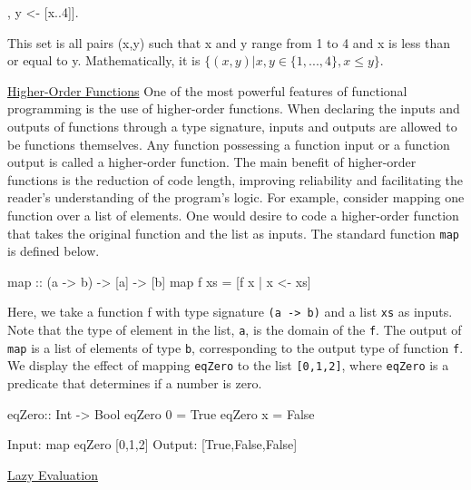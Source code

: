 \documentclass[11pt]{article}
\begin{document}
\hspace{2cm}\begin{verbbox}
[(x,y) | x <- [1..4], y <- [x..4]]. 
\end{verbbox}
\theverbbox

This set is all pairs (x,y) such that x and y range from 1 to 4 and x is less than or equal to y. Mathematically, it is $\{(x,y) | x,y \in \{1,...,4\}, x \le y\}$.

\hspace{0.5cm}\underline{Higher-Order Functions}
One of the most powerful features of functional programming is the use of higher-order functions. When declaring the inputs and outputs of functions through a type signature, inputs and outputs are allowed to be functions themselves. Any function possessing a function input or a function output is called a higher-order function. The main benefit of higher-order functions is the reduction of code length, improving reliability and facilitating the reader's understanding of the program's logic. For example, consider mapping one function over a list of elements. One would desire to code a higher-order function that takes the original function and the list as inputs. The standard function \texttt{map} is defined below.

\hspace{2cm}\begin{verbbox}
map :: (a -> b) -> [a] -> [b]
map f xs = [f x | x <- xs]
\end{verbbox}
\theverbbox

Here, we take a function f with type signature \texttt{(a -> b)} and a list \texttt{xs} as inputs. Note that the type of element in the list, \texttt{a}, is the domain of the \texttt{f}. The output of \texttt{map} is a list of elements of type \texttt{b}, corresponding to the output type of function \texttt{f}. We display the effect of mapping \texttt{eqZero} to the list \texttt{[0,1,2]}, where \texttt{eqZero} is a predicate that determines if a number is zero.

\hspace{2cm}\begin{verbbox}
eqZero:: Int -> Bool                                                                                       
eqZero 0 = True
eqZero x = False

Input:   map eqZero [0,1,2] 
Output: [True,False,False]      
\end{verbbox}
\theverbbox

\hspace{0.5cm}\underline{Lazy Evaluation}
\end{document}
